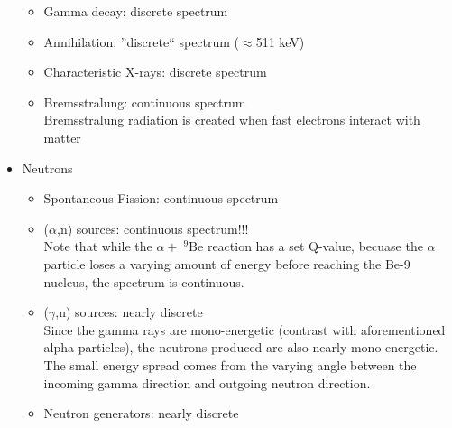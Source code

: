 \begin{itemize}
\begin{itemize}
        \item Gamma decay: discrete spectrum
        \item Annihilation: ''discrete`` spectrum ($\approx$511 keV)
        \item Characteristic X-rays: discrete spectrum  
        \item Bremsstralung: continuous spectrum\\
        Bremsstralung radiation is created when fast electrons interact with matter
    \end{itemize}
    \item Neutrons
    \begin{itemize}
        \item Spontaneous Fission: continuous spectrum
        \item ($\alpha$,n) sources: continuous spectrum!!!\\
        Note that while the $\alpha+ \;^9\text{Be}$ reaction has a set Q-value, becuase the $\alpha$ particle loses a varying amount of energy before reaching the Be-9 nucleus, the spectrum is continuous.
        \item ($\gamma$,n) sources: nearly discrete\\
        Since the gamma rays are mono-energetic (contrast with aforementioned alpha particles), the neutrons produced are also nearly mono-energetic. The small energy spread comes from the varying angle between the incoming gamma direction and outgoing neutron direction. 
        \item Neutron generators: nearly discrete
    \end{itemize}
\end{itemize}
